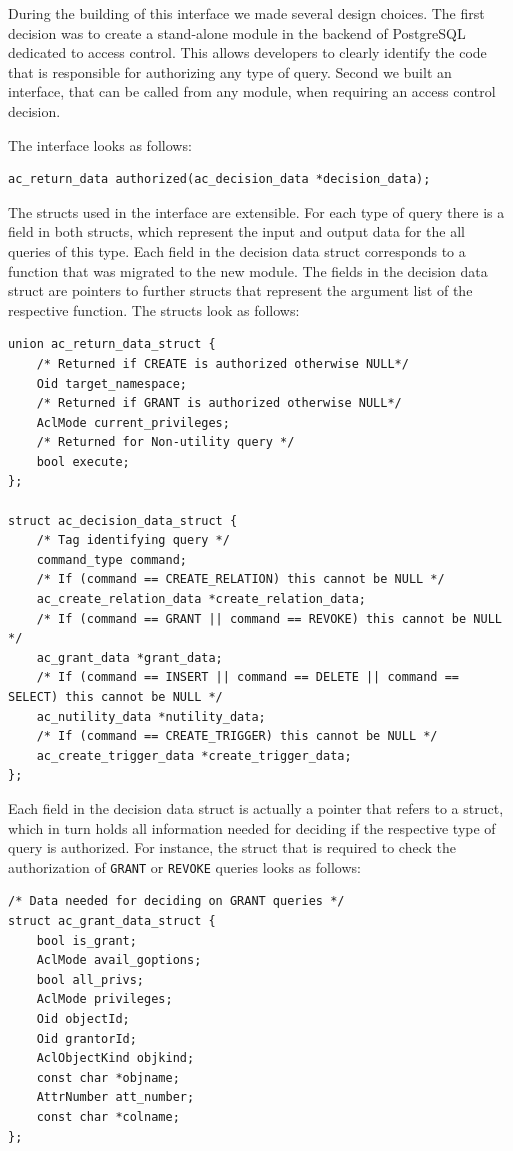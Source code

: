 During the building of this interface we made several design choices.
%
The first decision was to create a stand-alone module in the backend of PostgreSQL dedicated to access control.
This allows developers to clearly identify the code that is responsible for authorizing any type of query.
%
Second we built an interface, that can be called from any module, when requiring an access control decision.

The interface looks as follows:
%
\begin{lstlisting}[frame=single, style=customc]
ac_return_data authorized(ac_decision_data *decision_data);
\end{lstlisting}
%
The structs used in the interface are extensible. For each type of query there is a field in both structs, which represent the input and output data for the all queries of this type.
%
Each field in the decision data struct corresponds to a function that was migrated to the new module. 
%
The fields in the decision data struct are pointers to further structs that represent the argument list of the respective function.
%
The structs look as follows: 
%
\begin{lstlisting}[frame=single, style=customc]
union ac_return_data_struct {
	/* Returned if CREATE is authorized otherwise NULL*/
	Oid target_namespace; 
	/* Returned if GRANT is authorized otherwise NULL*/
	AclMode current_privileges; 
	/* Returned for Non-utility query */
	bool execute; 
};

struct ac_decision_data_struct {
	/* Tag identifying query */
	command_type command;
	/* If (command == CREATE_RELATION) this cannot be NULL */
	ac_create_relation_data *create_relation_data; 
	/* If (command == GRANT || command == REVOKE) this cannot be NULL */
	ac_grant_data *grant_data; 
	/* If (command == INSERT || command == DELETE || command == SELECT) this cannot be NULL */
	ac_nutility_data *nutility_data; 
	/* If (command == CREATE_TRIGGER) this cannot be NULL */
	ac_create_trigger_data *create_trigger_data; 
};
\end{lstlisting}
%
Each field in the decision data struct is actually a pointer that refers to a struct, which in turn holds all information needed for deciding if the respective type of query is authorized.
%
For instance, the struct that is required to check the authorization of \texttt{GRANT} or \texttt{REVOKE} queries looks as follows:
%
\begin{lstlisting}[frame=single, style=customc]
/* Data needed for deciding on GRANT queries */
struct ac_grant_data_struct {
	bool is_grant;
	AclMode avail_goptions;
	bool all_privs;
	AclMode privileges;
	Oid objectId;
	Oid grantorId;
	AclObjectKind objkind;
	const char *objname;
	AttrNumber att_number;
	const char *colname;
};
\end{lstlisting}
